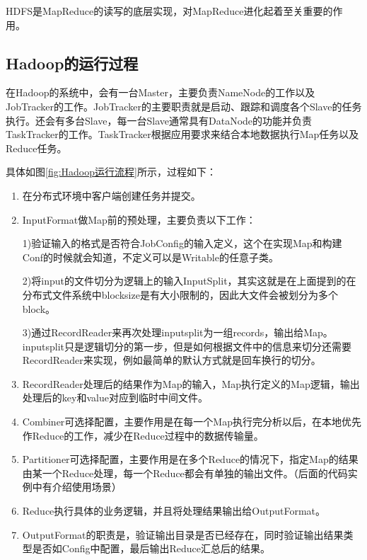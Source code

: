HDFS是MapReduce的读写的底层实现，对MapReduce进化起着至关重要的作用。

\subsection{Hadoop的运行过程}
在Hadoop的系统中，会有一台Master，主要负责NameNode的工作以及JobTracker的工作。JobTracker的主要职责就是启动、跟踪和调度各个Slave的任务执行。还会有多台Slave，每一台Slave通常具有DataNode的功能并负责TaskTracker的工作。TaskTracker根据应用要求来结合本地数据执行Map任务以及Reduce任务。

具体如图\ref{fig:Hadoop运行流程}所示，过程如下：

\begin{enumerate}
\item 在分布式环境中客户端创建任务并提交。

\item InputFormat做Map前的预处理，主要负责以下工作：

1)验证输入的格式是否符合JobConfig的输入定义，这个在实现Map和构建Conf的时候就会知道，不定义可以是Writable的任意子类。

2)将input的文件切分为逻辑上的输入InputSplit，其实这就是在上面提到的在分布式文件系统中blocksize是有大小限制的，因此大文件会被划分为多个block。

3)通过RecordReader来再次处理inputsplit为一组records，输出给Map。inputsplit只是逻辑切分的第一步，但是如何根据文件中的信息来切分还需要RecordReader来实现，例如最简单的默认方式就是回车换行的切分。

\item RecordReader处理后的结果作为Map的输入，Map执行定义的Map逻辑，输出处理后的key和value对应到临时中间文件。

\item Combiner可选择配置，主要作用是在每一个Map执行完分析以后，在本地优先作Reduce的工作，减少在Reduce过程中的数据传输量。

\item Partitioner可选择配置，主要作用是在多个Reduce的情况下，指定Map的结果由某一个Reduce处理，每一个Reduce都会有单独的输出文件。（后面的代码实例中有介绍使用场景）

\item Reduce执行具体的业务逻辑，并且将处理结果输出给OutputFormat。

\item OutputFormat的职责是，验证输出目录是否已经存在，同时验证输出结果类型是否如Config中配置，最后输出Reduce汇总后的结果。
\end{enumerate}

